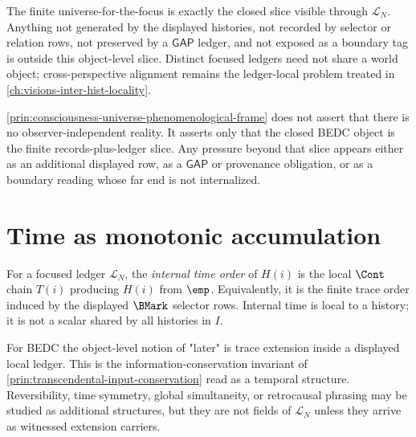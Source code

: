 \begin{principle}
\label{prin:consciousness-universe-phenomenological-frame}
The finite universe-for-the-focus is exactly the closed slice visible through $\mathcal{L}_N$. Anything not generated by the displayed histories, not recorded by selector or relation rows, not preserved by a $\mathsf{GAP}$ ledger, and not exposed as a boundary tag is outside this object-level slice. Distinct focused ledgers need not share a world object; cross-perspective alignment remains the ledger-local problem treated in \autoref{ch:visions-inter-hist-locality}.
\end{principle}

\begin{remark}
\label{rem:consciousness-universe-structural-not-metaphysical}
\autoref{prin:consciousness-universe-phenomenological-frame} does not assert that there is no observer-independent reality. It asserts only that the closed BEDC object is the finite records-plus-ledger slice. Any pressure beyond that slice appears either as an additional displayed row, as a $\mathsf{GAP}$ or provenance obligation, or as a boundary reading whose far end is not internalized.
\end{remark}

\section{Time as monotonic accumulation}
\label{sec:consciousness-universe-time-as-accumulation}

\begin{definition}
\label{def:consciousness-universe-bedc-time}
For a focused ledger $\mathcal{L}_N$, the \emph{internal time order} of $H(i)$ is the local $\Cont$ chain $T(i)$ producing $H(i)$ from $\emp$. Equivalently, it is the finite trace order induced by the displayed $\BMark$ selector rows. Internal time is local to a history; it is not a scalar shared by all histories in $I$.
\end{definition}

\begin{principle}
\label{prin:consciousness-universe-time-is-accumulation}
For BEDC the object-level notion of "later" is trace extension inside a displayed local ledger. This is the information-conservation invariant of \autoref{prin:transcendental-input-conservation} read as a temporal structure. Reversibility, time symmetry, global simultaneity, or retrocausal phrasing may be studied as additional structures, but they are not fields of $\mathcal{L}_N$ unless they arrive as witnessed extension carriers.
\end{principle}

